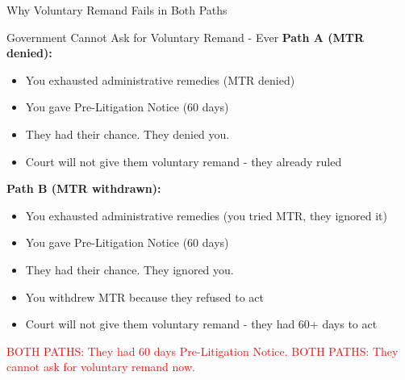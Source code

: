 \documentclass[11pt]{beamer}
\begin{document}
	\begin{frame}{Why Voluntary Remand Fails in Both Paths}
		\scriptsize
		\begin{block}{Government Cannot Ask for Voluntary Remand - Ever}
			\textbf{Path A (MTR denied):}
			\begin{itemize}
				\item You exhausted administrative remedies (MTR denied)
				\item You gave Pre-Litigation Notice (60 days)
				\item They had their chance. They denied you.
				\item Court will not give them voluntary remand - they already ruled
			\end{itemize}
			\textbf{Path B (MTR withdrawn):}
			\begin{itemize}
				\item You exhausted administrative remedies (you tried MTR, they ignored it)
				\item You gave Pre-Litigation Notice (60 days)
				\item They had their chance. They ignored you.
				\item You withdrew MTR because they refused to act
				\item Court will not give them voluntary remand - they had 60+ days to act
			\end{itemize}
			\textcolor{red}{BOTH PATHS: They had 60 days Pre-Litigation Notice.}
			\textcolor{red}{BOTH PATHS: They cannot ask for voluntary remand now.}
		\end{block}
	\end{frame}
	
\end{document}
